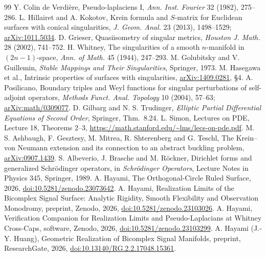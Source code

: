 \documentclass[11pt]{article}
\theoremstyle{definition}\newtheorem{definition}[theorem]{Definition}
\theoremstyle{remark}\newtheorem{remark}[theorem]{Remark}
\begin{document}
{\footnotesize
\begin{thebibliography}{99}
 Y. Colin de Verdi\`ere, Pseudo-laplaciens I, \emph{Ann. Inst.
Fourier} 32 (1982), 275--286.
 L. Hillairet and A. Kokotov, Krein formula and $S$-matrix for
Euclidean surfaces with conical singularities, \emph{J. Geom. Anal.} 23 (2013),
1498--1529;
\href{https://arxiv.org/abs/1011.5034}{arXiv:1011.5034}.
 D. Grieser, Quasiisometry of singular metrics, \emph{Houston
J. Math.} 28 (2002), 741--752.
 H. Whitney, The singularities of a smooth $n$-manifold in
$(2n-1)$-space, \emph{Ann. of Math.} 45 (1944), 247--293.
 M. Golubitsky and V. Guillemin, \emph{Stable Mappings and Their
Singularities}, Springer, 1973.
 M. Hasegawa et al., Intrinsic properties of surfaces with
singularities, \href{https://arxiv.org/abs/1409.0281}{arXiv:1409.0281}, \S4.
 A. Posilicano, Boundary triples and Weyl functions for singular
perturbations of self-adjoint operators, \emph{Methods Funct. Anal. Topology}
10 (2004), 57--63; \href{https://arxiv.org/abs/math/0309077}{arXiv:math/0309077}.
 D. Gilbarg and N. S. Trudinger, \emph{Elliptic Partial
Differential Equations of Second Order}, Springer, Thm.~8.24.
 L. Simon, Lectures on PDE, Lecture 18, Theorems 2--3,
\url{https://math.stanford.edu/~lms/lecs-on-pde.pdf}.
 M. S. Ashbaugh, F. Gesztesy, M. Mitrea, R. Shterenberg and
G. Teschl, The Krein--von Neumann extension and its connection to an abstract
buckling problem, \href{https://arxiv.org/abs/0907.1439}{arXiv:0907.1439}.
 S. Albeverio, J. Brasche and M. R\"ockner, Dirichlet forms and
generalized Schr\"odinger operators, in \emph{Schr\"odinger Operators}, Lecture
Notes in Physics 345, Springer, 1989.
 A. Hayami, The Orthogonal-Circle Ruled Surface, 2026,
\href{https://doi.org/10.5281/zenodo.23073642}{doi:10.5281/zenodo.23073642}.
 A. Hayami, Realization Limits of the Bicomplex Signal Surface:
Analytic Rigidity, Smooth Flexibility and Observation Monodromy, preprint, Zenodo,
2026, \href{https://doi.org/10.5281/zenodo.23103026}{doi:10.5281/zenodo.23103026}.
 A. Hayami, Verification Companion for Realization Limits and
Pseudo-Laplacians at Whitney Cross-Caps, software, Zenodo, 2026,
\href{https://doi.org/10.5281/zenodo.23103299}{doi:10.5281/zenodo.23103299}.
 A. Hayami (J.-Y. Huang), Geometric Realization of Bicomplex
Signal Manifolds, preprint, ResearchGate, 2026,
\href{https://doi.org/10.13140/RG.2.2.17048.15361}{doi:10.13140/RG.2.2.17048.15361}.
\end{thebibliography}}
\end{document}

